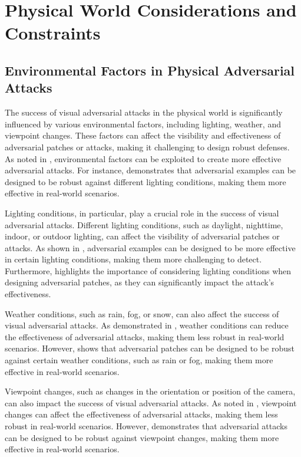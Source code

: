 \documentclass[11pt,a4paper]{article}
\begin{document}
\section{Physical World Considerations and Constraints}



\subsection{Environmental Factors in Physical Adversarial Attacks}


The success of visual adversarial attacks in the physical world is significantly influenced by various environmental factors, including lighting, weather, and viewpoint changes. These factors can affect the visibility and effectiveness of adversarial patches or attacks, making it challenging to design robust defenses. As noted in \cite{doi:10.1145/3128572.3140444}, environmental factors can be exploited to create more effective adversarial attacks. For instance, \cite{arxiv:1707.08945} demonstrates that adversarial examples can be designed to be robust against different lighting conditions, making them more effective in real-world scenarios.

Lighting conditions, in particular, play a crucial role in the success of visual adversarial attacks. Different lighting conditions, such as daylight, nighttime, indoor, or outdoor lighting, can affect the visibility of adversarial patches or attacks. As shown in \cite{doi:10.24963/ijcai.2021/694}, adversarial examples can be designed to be more effective in certain lighting conditions, making them more challenging to detect. Furthermore, \cite{arxiv:1906.11897} highlights the importance of considering lighting conditions when designing adversarial patches, as they can significantly impact the attack's effectiveness.

Weather conditions, such as rain, fog, or snow, can also affect the success of visual adversarial attacks. As demonstrated in \cite{doi:10.1109/tnnls.2023.3321432}, weather conditions can reduce the effectiveness of adversarial attacks, making them less robust in real-world scenarios. However, \cite{doi:10.1016/j.eswa.2025.128967} shows that adversarial patches can be designed to be robust against certain weather conditions, such as rain or fog, making them more effective in real-world scenarios.

Viewpoint changes, such as changes in the orientation or position of the camera, can also impact the success of visual adversarial attacks. As noted in \cite{arxiv:1902.06705}, viewpoint changes can affect the effectiveness of adversarial attacks, making them less robust in real-world scenarios. However, \cite{doi:10.1007/978-3-030-10925-7_4} demonstrates that adversarial attacks can be designed to be robust against viewpoint changes, making them more effective in real-world scenarios.
\end{document}
